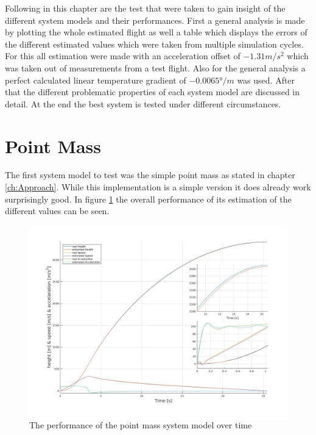 Following in this chapter are the test that were taken to gain insight of the different system models and their performances.
First a general analysis is made by plotting the whole estimated flight as well a table which displays the errors of the different estimated values which were taken from multiple simulation cycles.
For this all estimation were made with an acceleration offset of $ -1.31 m/s^2$  which was taken out of measurements from a test flight.
Also for the general analysis a perfect calculated linear temperature gradient of $-0.0065 °/m$ was used.
After that the different problematic properties of each system model are discussed in detail.
At the end the best system is tested under different circumstances.


\section{Point Mass}
The first system model to test was the simple point mass as stated in chapter \ref{ch:Approach}.
While this implementation is a simple version it does already work surprisingly good.
In figure \ref{fig:PointMassPerformance} the overall performance of its estimation of the different values can be seen.


\begin{figure}[h!]
 \centering
 \includegraphics[width=.8\textwidth]{./Pictures/PointMassPerformance.jpg}
 \caption{The performance of the point mass system model over time}
 \label{fig:PointMassPerformance}
\end{figure}


